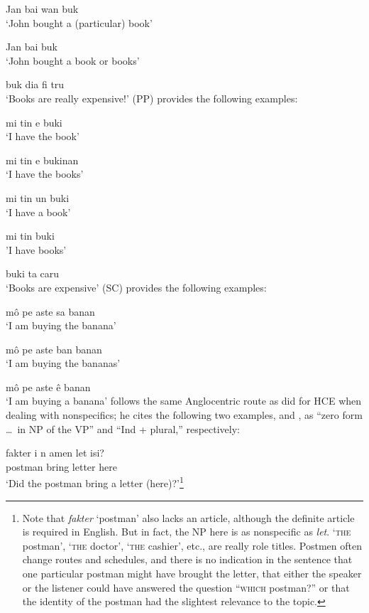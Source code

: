 \ea\label{ex:2:14}
 Jan bai wan buk\\
\glt `John bought a (particular) book'
\z


\ea\label{ex:2:15}
Jan bai buk\\
\glt `John bought a book or books'
\z

\ea\label{ex:2:16}
 buk dia fi tru\\
\glt `Books are really expensive!'
\z
 (PP) provides the following examples:

\ea\label{ex:2:17}
mi tin e buki\\
\glt `I have the book'
\z

\ea\label{ex:2:18}
mi tin e bukinan \\
\glt `I have the books'
\z

\ea\label{ex:2:19}
mi tin un buki\\
\glt `I have a book'
\z

\ea\label{ex:2:20}
mi tin buki\\
\glt  'I have books'
\z

\ea\label{ex:2:21}
buki ta caru \\
\glt `Books are expensive'
\z
{} (SC) provides the following examples:

\ea\label{ex:2:22}
 m\^o pe aste sa banan \\
\glt `I am buying the banana'
\z

\ea\label{ex:2:23}
m\^o pe aste ban banan\\
\glt `I am buying the bananas'
\z

\ea\label{ex:2:24}
 m\^o pe aste \^e banan\\
\glt `I am buying a banana'
\z
\citet[13]{Corne1977} follows the same Anglocentric route as \citet{Perlman1973} did for HCE when dealing with nonspecifics; he cites the following two examples,  and , as ``zero form \ldots~in NP of the VP'' and ``Ind + plural,'' respectively:

\ea\label{ex:2:25}
\gll fakter i n amen let isi?\\
postman {\PM} {\COMP} bring letter here\\
\glt `Did the postman bring a letter (here)?'\footnote{Note that \textit{fakter} `postman' also lacks an article, although the definite article is required in English. But in fact, the NP here is as nonspecific as \textit{let}. `\textsc{the} postman', `\textsc{the} doctor', `\textsc{the} cashier', etc., are really role titles. Postmen often change routes and schedules, and there is no indication in the sentence that one particular postman might have brought the letter, that either the speaker or the listener could have answered the question ``\textsc{which} postman?'' or that the identity of the postman had the slightest relevance to the topic.}
\z

